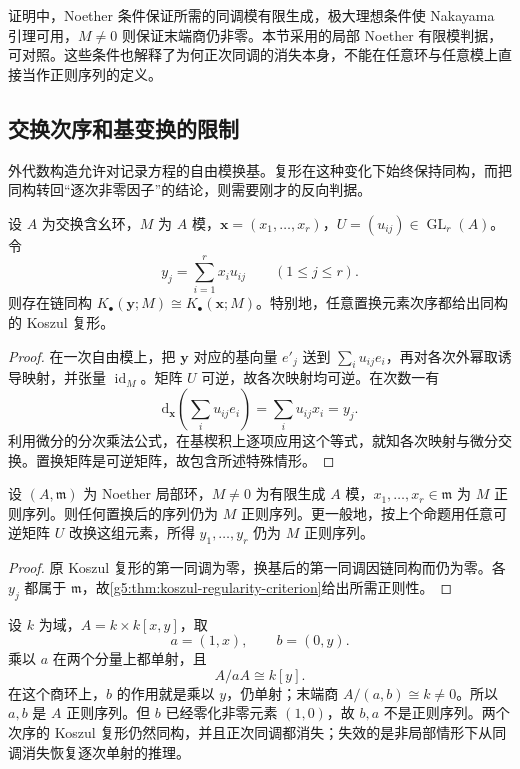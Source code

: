 证明中，Noether 条件保证所需的同调模有限生成，极大理想条件使 Nakayama 引理可用，\(M\ne0\) 则保证末端商仍非零。本节采用的局部 Noether 有限模判据，可对照\cite[第16节，定理16.5，第128—129页]{Matsumura1989}。这些条件也解释了为何正次同调的消失本身，不能在任意环与任意模上直接当作正则序列的定义。

\subsection{交换次序和基变换的限制}
\label{g5:subsec:0802:05}

外代数构造允许对记录方程的自由模换基。复形在这种变化下始终保持同构，而把同构转回“逐次非零因子”的结论，则需要刚才的反向判据。

\begin{proposition}\label{g5:prop:koszul-change-basis}
	设 \(A\) 为交换含幺环，\(M\) 为 \(A\) 模，\(\mathbf x=(x_1,\ldots,x_r)\)，\(U=(u_{ij})\in\operatorname{GL}_r(A)\)。令
	\[
		y_j=\sum_{i=1}^r x_i u_{ij}\qquad(1\leq j\leq r).
	\]
	则存在链同构 \(K_\bullet(\mathbf y;M)\cong K_\bullet(\mathbf x;M)\)。特别地，任意置换元素次序都给出同构的 Koszul 复形。
\end{proposition}
\begin{proof}
	在一次自由模上，把 \(\mathbf y\) 对应的基向量 \(e'_j\) 送到 \(\sum_i u_{ij}e_i\)，再对各次外幂取诱导映射，并张量 \(\operatorname{id}_M\)。矩阵 \(U\) 可逆，故各次映射均可逆。在次数一有
	\[
		\mathrm d_{\mathbf x}\left(\sum_i u_{ij}e_i\right)
		=\sum_i u_{ij}x_i=y_j.
	\]
	利用微分的分次乘法公式，在基楔积上逐项应用这个等式，就知各次映射与微分交换。置换矩阵是可逆矩阵，故包含所述特殊情形。
\end{proof}

\begin{corollary}\label{g5:cor:regular-sequence-permutation}
	设 \((A,\mathfrak m)\) 为 Noether 局部环，\(M\ne0\) 为有限生成 \(A\) 模，\(x_1,\ldots,x_r\in\mathfrak m\) 为 \(M\) 正则序列。则任何置换后的序列仍为 \(M\) 正则序列。更一般地，按上个命题用任意可逆矩阵 \(U\) 改换这组元素，所得 \(y_1,\ldots,y_r\) 仍为 \(M\) 正则序列。
\end{corollary}
\begin{proof}
	原 Koszul 复形的第一同调为零，换基后的第一同调因链同构而仍为零。各 \(y_j\) 都属于 \(\mathfrak m\)，故\cref{g5:thm:koszul-regularity-criterion}给出所需正则性。
\end{proof}

\begin{example}\label{g5:exm:nonlocal-regular-order}
	设 \(k\) 为域，\(A=k\times k[x,y]\)，取
	\[
		a=(1,x),\qquad b=(0,y).
	\]
	乘以 \(a\) 在两个分量上都单射，且
	\[
		A/aA\cong k[y].
	\]
	在这个商环上，\(b\) 的作用就是乘以 \(y\)，仍单射；末端商 \(A/(a,b)\cong k\ne0\)。所以 \(a,b\) 是 \(A\) 正则序列。但 \(b\) 已经零化非零元素 \((1,0)\)，故 \(b,a\) 不是正则序列。两个次序的 Koszul 复形仍然同构，并且正次同调都消失；失效的是非局部情形下从同调消失恢复逐次单射的推理。
\end{example}

